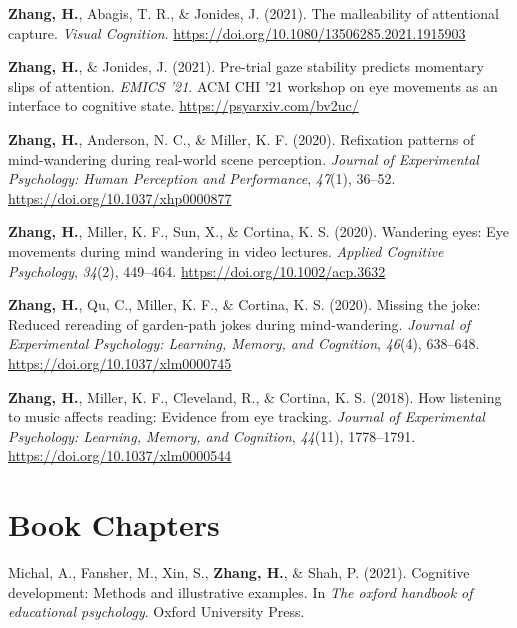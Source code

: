 \documentclass[11pt,a4paper,]{awesome-cv}
\begin{document}
\leavevmode{}%
\textbf{Zhang, H.}, Abagis, T. R., \& Jonides, J. (2021). The
malleability of attentional capture. \emph{Visual Cognition}.
\url{https://doi.org/10.1080/13506285.2021.1915903}

\leavevmode{}%
\textbf{Zhang, H.}, \& Jonides, J. (2021). Pre-trial gaze stability
predicts momentary slips of attention. \emph{EMICS '21}. ACM CHI '21
workshop on eye movements as an interface to cognitive state.
\url{https://psyarxiv.com/bv2uc/}

\leavevmode{}%
\textbf{Zhang, H.}, Anderson, N. C., \& Miller, K. F. (2020). Refixation
patterns of mind-wandering during real-world scene perception.
\emph{Journal of Experimental Psychology: Human Perception and
Performance}, \emph{47}(1), 36--52.
\url{https://doi.org/10.1037/xhp0000877}

\leavevmode{}%
\textbf{Zhang, H.}, Miller, K. F., Sun, X., \& Cortina, K. S. (2020).
Wandering eyes: Eye movements during mind wandering in video lectures.
\emph{Applied Cognitive Psychology}, \emph{34}(2), 449--464.
\url{https://doi.org/10.1002/acp.3632}

\leavevmode{}%
\textbf{Zhang, H.}, Qu, C., Miller, K. F., \& Cortina, K. S. (2020).
Missing the joke: Reduced rereading of garden-path jokes during
mind-wandering. \emph{Journal of Experimental Psychology: Learning,
Memory, and Cognition}, \emph{46}(4), 638--648.
\url{https://doi.org/10.1037/xlm0000745}

\leavevmode{}%
\textbf{Zhang, H.}, Miller, K. F., Cleveland, R., \& Cortina, K. S.
(2018). How listening to music affects reading: Evidence from eye
tracking. \emph{Journal of Experimental Psychology: Learning, Memory,
and Cognition}, \emph{44}(11), 1778--1791.
\url{https://doi.org/10.1037/xlm0000544}

\hypertarget{book-chapters}{%
\section{Book Chapters}\label{book-chapters}}

\hypertarget{bibliography}{}
\leavevmode{}%
Michal, A., Fansher, M., Xin, S., \textbf{Zhang, H.}, \& Shah, P.
(2021). Cognitive development: Methods and illustrative examples. In
\emph{The oxford handbook of educational psychology}. Oxford University
Press.
\end{document}
